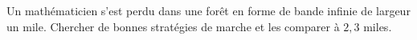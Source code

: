 Un mathématicien s'est perdu dans une forêt en forme de bande infinie de largeur un mile. Chercher de bonnes stratégies de marche et les comparer à $2{,}3$ miles.
